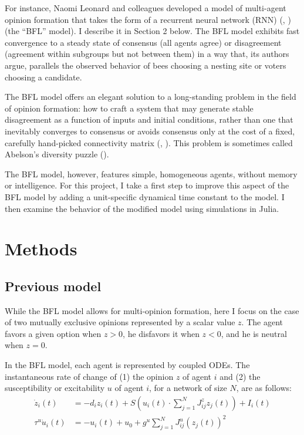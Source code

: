 \documentclass[]{article}
\begin{document}
For instance, Naomi Leonard and colleagues developed a model of multi-agent opinion formation that takes the form of a recurrent neural network (RNN) (\cite{bizyaevaNonlinearOpinionDynamics2022}, \cite{leonardFastFlexibleMultiAgent2024}) (the “BFL” model). I describe it in Section 2 below. The BFL model exhibits fast convergence to a steady state of consensus (all agents agree) or disagreement (agreement within subgroups but not between them) in a way that, its authors argue, parallels the observed behavior of bees choosing a nesting site or voters choosing a candidate.

The BFL model offers an elegant solution to a long-standing problem in the field of opinion formation: how to craft a system that may generate stable disagreement as a function of inputs and initial conditions, rather than one that inevitably converges to consensus or avoids consensus only at the cost of a fixed, carefully hand-picked connectivity matrix (\cite{ravazziDynamicalSocialNetworks2021}, \cite{bernardoBoundedConfidenceOpinion2024}). This problem is sometimes called Abelson's diversity puzzle (\cite{abelsonMathematicalModelsDistribution1964}).

The BFL model, however, features simple, homogeneous agents, without memory or intelligence.  For this project, I take a first step to improve this aspect of the BFL model by adding a unit-specific dynamical time constant to the model. I then examine the behavior of the modified model using simulations in Julia.

\section{Methods}
\subsection{Previous model}

While the BFL model allows for multi-opinion formation, here I focus on the case of two mutually exclusive opinions represented by a scalar value $z$. The agent favors a given option when $z>0$, he disfavors it when $z<0$, and he is neutral when $z = 0$.

In the BFL model, each agent is represented by coupled ODEs. The instantaneous rate of change of (1) the opinion $z$ of agent $i$ and (2) the susceptibility or excitability $u$ of agent $i$, for a network of size $N$, are as follows:
\begin{align}
	\dot{z}_{i}(t) &= -d_{i}z_{i}(t) + S \left( u_i(t) \cdot  \sum^{N}_{j=1} J^z_{ij}z_{j}(t)  \right) + I_{i}(t) \\
	\tau^u \dot{u}_i(t) &= -u_i(t)+u_0+g^u \sum ^{N}_{j=1} J^u_{ij}(z_{j}(t))^2
\end{align}
\end{document}
